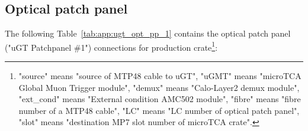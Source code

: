 \clearpage

\subsection{Optical patch panel}\label{sec:app:app_d}

The following Table~\ref{tab:app:ugt_opt_pp_1} contains the optical patch panel ("uGT Patchpanel \#1") connections for production crate\footnote{"source" means "source of MTP48 cable to uGT", "uGMT" means "microTCA Global Muon Trigger module", "demux" means "Calo-Layer2 demux module", "ext\_cond" means "External condition AMC502 module", "fibre" means "fibre number of a MTP48 cable", "LC" means "LC number of optical patch panel", "slot" means "destination MP7 slot number of microTCA crate".\label{note_ugt_opt_pp_1}}:

